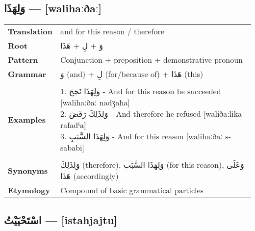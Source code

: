 \documentclass[letterpaper,12pt]{article}
\begin{document}
\subsection{\textarabic{وَلِهَذَا} — [walihaːðaː]}

\begin{tabular}{p{3cm}p{10cm}}
\toprule
\textbf{Translation} & and for this reason / therefore \\
\textbf{Root} & \textarabic{وَ} + \textarabic{لِ} + \textarabic{هَذَا} \\
\textbf{Pattern} & Conjunction + preposition + demonstrative pronoun \\
\textbf{Grammar} & \textarabic{وَ} (and) + \textarabic{لِ} (for/because of) + \textarabic{هَذَا} (this) \\
\midrule \\
\textbf{Examples} & \makecell[l]{\parbox{9.5cm}{
1. \textarabic{وَلِهَذَا نَجَحَ} - And for this reason he succeeded [walihaːðaː nadʒaħa]\\
2. \textarabic{وَلِذَلِكَ رَفَضَ} - And therefore he refused [waliðaːlika rafadˤa]\\
3. \textarabic{وَلِهَذَا السَّبَبِ} - And for this reason [walihaːðaː s-sababi]
}} \\
\midrule \\
\textbf{Synonyms} & \textarabic{وَلِذَلِكَ} (therefore), \textarabic{وَلِهَذَا السَّبَب} (for this reason), \textarabic{وَعَلَى هَذَا} (accordingly) \\
\textbf{Etymology} & Compound of basic grammatical particles \\
\bottomrule
\end{tabular}

\subsection{\textarabic{اسْتَحْيَيْتُ} — [istaħjajtu]}
\end{document}
